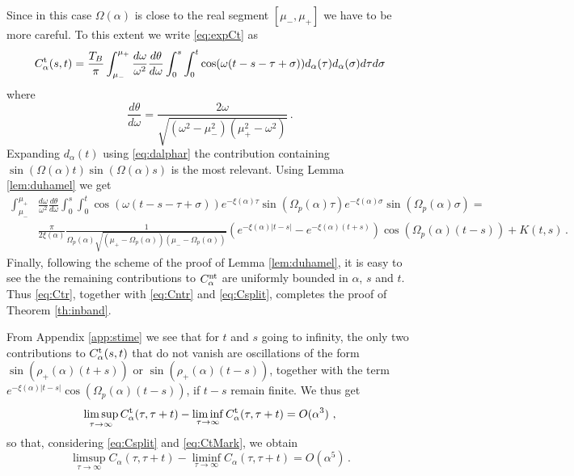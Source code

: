 \documentclass[11pt]{article}
\numberwithin{equation}{section}
\numberwithin{theorem}{section}
\begin{document}
Since in this case $\Omega(\alpha)$ is close to the real segment $[\mu_-,\mu_+]$  we have to be more careful. To this 
extent we write 
\eqref{eq:expCt} as
\begin{equation}\label{eq:calC}
	C^{\rm
		t}_{\alpha}(s,t)=\frac{T_B}\pi\int_{\mu_-}^{\mu_+}\frac{d\omega}{\omega^2}\frac{d\theta}{d\omega}\int_0^s
	\int_0^t \cos(\omega(t-s-\tau+\sigma))d_{\alpha}(\tau)d_{\alpha}(\sigma)d\tau d\sigma
\end{equation}
where
\begin{equation}\label{eq:dtdo}
\frac{d\theta}{d\omega}=\frac{2\omega}{\sqrt{(\omega^2-\mu_-^2)(\mu_+^2-\omega^2)}}\, .
\end{equation}
Expanding $d_\alpha(t)$ using \eqref{eq:dalphar} the contribution containing 
$\sin(\Omega(\alpha)t)\sin(\Omega(\alpha)s)$ is the most relevant. Using Lemma \ref{lem:duhamel} we get
\begin{equation}\label{eq:Ctr}
\begin{aligned}
\int_{\mu_-}^{\mu_+}&\frac{d\omega}{\omega^2}\frac{d\theta}{d\omega}\int_0^s \int_0^t
\cos(\omega(t-s-\tau+\sigma))e^{-\xi(\alpha)\tau}
\sin(\Omega_p(\alpha)\tau)e^{-\xi(\alpha)\sigma}\sin(\Omega_p(\alpha)\sigma)=\\
&\frac{\pi}{2\xi(\alpha)}\frac{1}{\Omega_p(\alpha)\sqrt{(\mu_+-\Omega_p(\alpha))(\mu_--\Omega_p(\alpha))}}  
\left(e^{-\xi(\alpha)|t-s|}-e^{-\xi(\alpha)(t+s)}\right)\cos(\Omega_p(\alpha)(t-s))+
K(t,s)\,.
\end{aligned}
\end{equation}
Finally, following the scheme of the proof of Lemma \ref{lem:duhamel}, it is easy to see the the remaining contributions
to $C_\alpha^{\rm nt}$ are uniformly bounded in $\alpha$, $s$ and $t$. Thus \eqref{eq:Ctr}, together with
\eqref{eq:Cntr} and \eqref{eq:Csplit}, completes the proof of Theorem \ref{th:inband}.

From Appendix \ref{app:stime} we see that for $t$ and $s$ going to infinity, the only two contributions to $C_\alpha^{\rm
t}(s,t)$ that do not vanish are oscillations of the form
$\sin(\rho_+(\alpha)(t+s))$ or $\sin(\rho_+(\alpha)(t-s))$, together with
the term $e^{-\xi(\alpha)|t-s|}\cos(\Omega_p(\alpha)(t-s))$, if $t-s$
remain finite. We thus get
\[
\limsup_{\tau\to\infty}C^{\rm t}_\alpha(\tau,\tau+t)-
\liminf_{\tau\to\infty}C^{\rm t}_\alpha(\tau,\tau+t)=O(\alpha^3)\ ,
\]
so that, considering \eqref{eq:Csplit} and \eqref{eq:CtMark}, we obtain
\begin{equation}\label{eq:nonth}
\limsup_{\tau\to\infty}C_\alpha(\tau,\tau+t)- \liminf_{\tau\to\infty}C_\alpha(\tau,\tau+t)=O(\alpha^5)\, .
\end{equation}
\end{document}
